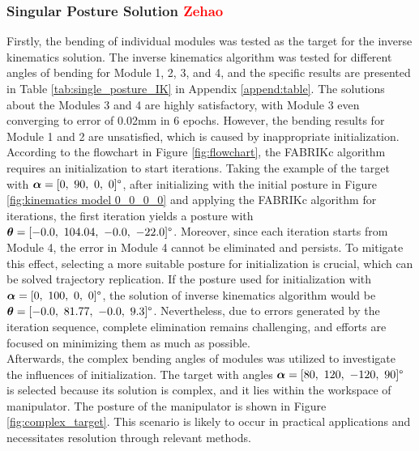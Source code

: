 \subsubsection{Singular Posture Solution \textcolor{red}{Zehao}}
Firstly, the bending of individual modules was tested as the target for the inverse kinematics solution. The 
inverse kinematics algorithm was tested for different angles of bending for Module 1, 2, 3, and 4, and the 
specific results are presented in Table \ref{tab:single_posture_IK} in Appendix \ref{append:table}. The 
solutions about the Modules 3 and 4 are highly satisfactory, with Module 3 even converging to error of 0.02mm 
in 6 epochs. However, the bending results for Module 1 and 2 are unsatisfied, which is caused by inappropriate 
initialization. According to the flowchart in Figure \ref{fig:flowchart}, the FABRIKc algorithm requires an 
initialization to start iterations. Taking the example of the target with 
$\boldsymbol{\alpha} = [0,\ 90,\ 0,\ 0]\degree$, after initializing with the initial posture in Figure 
\ref{fig:kinematics model 0_0_0_0} and applying the FABRIKc algorithm for iterations, the first iteration yields 
a posture with 
$\boldsymbol{\theta} = [-0.0,\ 104.04,\ -0.0,\ -22.0]\degree$. Moreover, since each iteration starts from Module 4, the error 
in Module 4 cannot be eliminated and persists. To mitigate this effect, selecting a more suitable posture for 
initialization is crucial, which can be solved trajectory replication. If the posture used for initialization with 
$\boldsymbol{\alpha} = [0,\ 100,\ 0,\ 0]\degree$, the solution of inverse kinematics algorithm would be 
$\boldsymbol{\theta} = [-0.0,\ 81.77,\ -0.0,\ 9.3]\degree$. Nevertheless, due to errors generated by the iteration sequence, 
complete elimination remains challenging, and efforts are focused on minimizing them as much as possible. \\
Afterwards, the complex bending angles of modules was utilized to investigate the influences of initialization. 
The target with angles $\boldsymbol{\alpha} = [80,\ 120,\ -120,\ 90]\degree$ is selected because its solution is complex, and 
it lies within the workspace of manipulator. The posture of the manipulator is shown in Figure 
\ref{fig:complex_target}. This scenario is likely to occur in practical applications and necessitates resolution 
through relevant methods.
